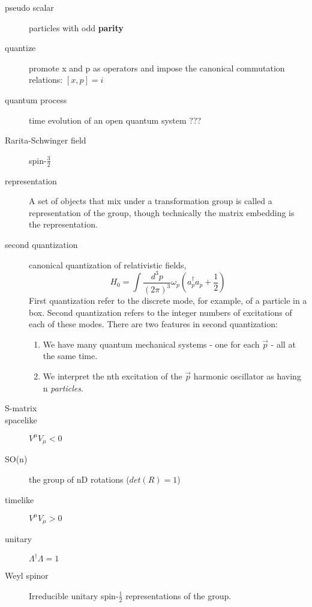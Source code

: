\begin{description}
    \item [pseudo scalar] particles with odd \textbf{parity}

    \item [quantize]	promote x and p as operators and impose the
	canonical commutation relations:    $[x, p] = i$
    \item [quantum process]  time evolution of an open quantum system ???

    \item [Rarita-Schwinger field]  spin-$\frac{3}{2}$
    \item [representation] A set of objects that mix under a transformation
	group is called a representation of the group, though technically
	the matrix embedding is the representation.

    \item [second quantization]	canonical quantization of relativistic
	fields, 
	\[  H_0 = \int \frac{d^{3}p}{(2\pi)^3}\omega_p(a^{\dag}_p a_p +
	\frac{1}{2}) \] 
	First quantization refer to the discrete mode, for
	example, of a particle in a box. Second quantization refers to the
	integer numbers of excitations of each of these modes. There are two
	features in second quantization:
	\begin{enumerate}
	    \item We have many quantum mechanical systems - one for each
		$\vec{p}$ - all at the same time.
	    \item We interpret the nth excitation of the $\vec{p}$ harmonic
		oscillator as having n \emph{particles}.
	\end{enumerate}
    \item [S-matrix]
    \item [spacelike]	$V^\mu V_\mu < 0$
    \item [SO(n)] the group of nD rotations ($det(R) = 1$)
	
    \item [timelike]	$V^\mu V_\mu > 0$

    \item [unitary] $\Lambda^{\dag}\Lambda = 1$

    \item [Weyl spinor] Irreducible unitary spin-$\frac{1}{2}$
	representations of the \Poincare{} group.


\end{description}
